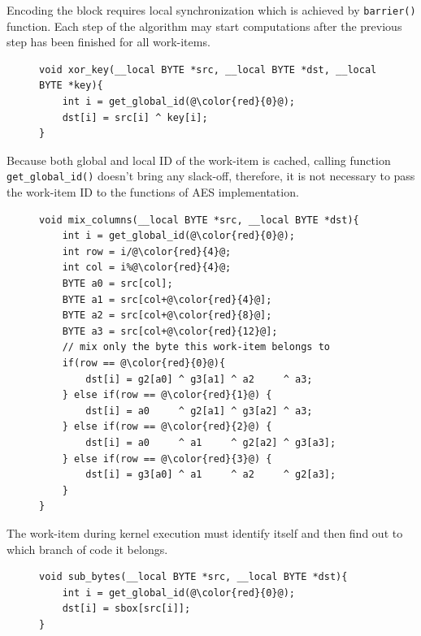 Encoding the block requires local synchronization which is achieved by
\texttt{barrier()} function. Each step of the algorithm may start computations
after the previous step has been finished for all work-items.

\begin{figure}[H]
\begin{lstlisting}
void xor_key(__local BYTE *src, __local BYTE *dst, __local BYTE *key){
    int i = get_global_id(@\color{red}{0}@);
    dst[i] = src[i] ^ key[i];
}
\end{lstlisting}
\end{figure}

Because both global and local ID of the work-item is cached, calling function 
\texttt{get\_global\_id()} doesn't bring any slack-off, therefore, it is not 
necessary to pass the work-item ID to the functions of AES implementation.

\begin{figure}[H]
\begin{lstlisting}
void mix_columns(__local BYTE *src, __local BYTE *dst){
    int i = get_global_id(@\color{red}{0}@);
    int row = i/@\color{red}{4}@;
    int col = i%@\color{red}{4}@;
    BYTE a0 = src[col]; 
    BYTE a1 = src[col+@\color{red}{4}@];
    BYTE a2 = src[col+@\color{red}{8}@];
    BYTE a3 = src[col+@\color{red}{12}@];
    // mix only the byte this work-item belongs to
    if(row == @\color{red}{0}@){
        dst[i] = g2[a0] ^ g3[a1] ^ a2     ^ a3;
    } else if(row == @\color{red}{1}@) {
        dst[i] = a0     ^ g2[a1] ^ g3[a2] ^ a3;
    } else if(row == @\color{red}{2}@) {
        dst[i] = a0     ^ a1     ^ g2[a2] ^ g3[a3];
    } else if(row == @\color{red}{3}@) {
        dst[i] = g3[a0] ^ a1     ^ a2     ^ g2[a3];
    }
}
\end{lstlisting}
\end{figure}

The work-item during kernel execution must identify itself and then find out to 
which branch of code it belongs.

\begin{figure}[H]
\begin{lstlisting}
void sub_bytes(__local BYTE *src, __local BYTE *dst){
    int i = get_global_id(@\color{red}{0}@);
    dst[i] = sbox[src[i]];
}
\end{lstlisting}
\end{figure}

